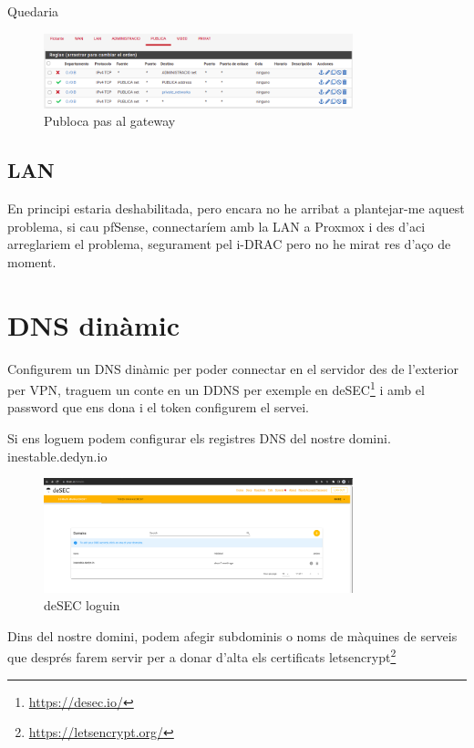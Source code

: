 \documentclass[
  10pt,
]{krantz}
\DeclareRobustCommand{\href}[2]{#2\footnote{\url{#1}}}
\begin{document}
Quedaria

\begin{figure}
\centering
\includegraphics[width=0.8\textwidth,height=\textheight]{imatges/proxmox/publica_regla4.png}
\caption{Publoca pas al gateway}
\end{figure}

\hypertarget{lan}{%
\subsection{LAN}\label{lan}}

En principi estaria deshabilitada, pero encara no he arribat a plantejar-me aquest problema, si cau pfSense, connectaríem amb la LAN a Proxmox i des d'aci arreglariem el problema, segurament pel i-DRAC pero no he mirat res d'aço de moment.

\hypertarget{dns-dinuxe0mic}{%
\section{DNS dinàmic}\label{dns-dinuxe0mic}}

Configurem un DNS dinàmic per poder connectar en el servidor des de l'exterior per VPN, traguem un conte en un DDNS per exemple en \href{https://desec.io/}{deSEC} i amb el password que ens dona i el token configurem el servei.

Si ens loguem podem configurar els registres DNS del nostre domini. inestable.dedyn.io

\begin{figure}
\centering
\includegraphics[width=0.8\textwidth,height=\textheight]{imatges/proxmox/domini_inestable.png}
\caption{deSEC loguin}
\end{figure}

Dins del nostre domini, podem afegir subdominis o noms de màquines de serveis que després farem servir per a donar d'alta els certificats \href{https://letsencrypt.org/}{letsencrypt}
\end{document}
